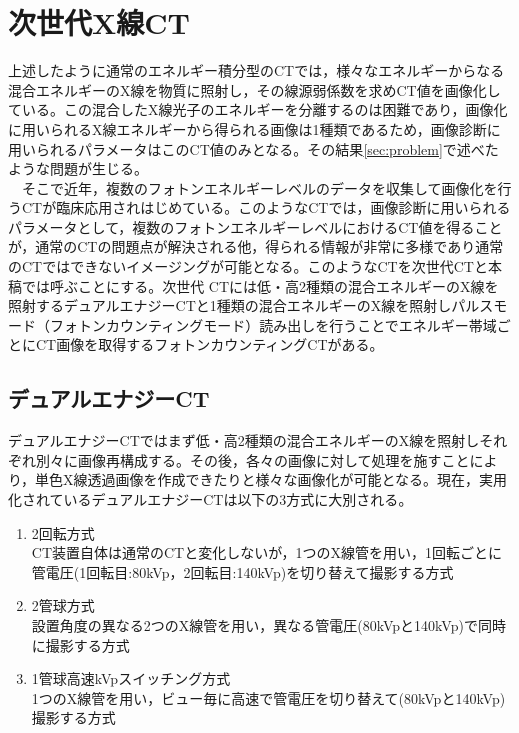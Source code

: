 \section{次世代X線CT}
上述したように通常のエネルギー積分型のCTでは，様々なエネルギーからなる混合エネルギーのX線を物質に照射し，その線源弱係数を求めCT値を画像化している。この混合したX線光子のエネルギーを分離するのは困難であり，画像化に用いられるX線エネルギーから得られる画像は1種類であるため，画像診断に用いられるパラメータはこのCT値のみとなる。その結果\ref{sec:problem}で述べたような問題が生じる。\\
\ \ そこで近年，複数のフォトンエネルギーレベルのデータを収集して画像化を行うCTが臨床応用されはじめている。このようなCTでは，画像診断に用いられるパラメータとして，複数のフォトンエネルギーレベルにおけるCT値を得ることが，通常のCTの問題点が解決される他，得られる情報が非常に多様であり通常のCTではできないイメージングが可能となる。このようなCTを次世代CTと本稿では呼ぶことにする。次世代
CTには低・高2種類の混合エネルギーのX線を照射するデュアルエナジーCTと1種類の混合エネルギーのX線を照射しパルスモード（フォトンカウンティングモード）読み出しを行うことでエネルギー帯域ごとにCT画像を取得するフォトンカウンティングCTがある。

\subsection{デュアルエナジーCT\label{sec:dual}}
デュアルエナジーCTではまず低・高2種類の混合エネルギーのX線を照射しそれぞれ別々に画像再構成する。その後，各々の画像に対して処理を施すことにより，単色X線透過画像を作成できたりと様々な画像化が可能となる。現在，実用化されているデュアルエナジーCTは以下の3方式に大別される\cite{GE}\cite{siemens}\cite{philips}。

\begin{enumerate}
\renewcommand{\labelenumi}{(\arabic{enumi})}
\item 2回転方式\\CT装置自体は通常のCTと変化しないが，1つのX線管を用い，1回転ごとに管電圧(1回転目:80kVp，2回転目:140kVp)を切り替えて撮影する方式
\item 2管球方式\\設置角度の異なる2つのX線管を用い，異なる管電圧(80kVpと140kVp)で同時に撮影する方式
\item 1管球高速kVpスイッチング方式\\1つのX線管を用い，ビュー毎に高速で管電圧を切り替えて(80kVpと140kVp)撮影する方式
\end{enumerate}

